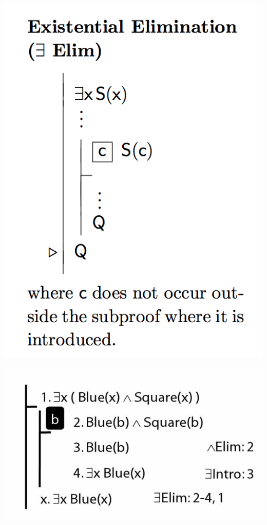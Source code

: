 \documentclass[12pt]{extarticle}
\begin{document}
\begin{multicols*}{3}
\begin{center}
\includegraphics[scale=0.3]{img/rule_existential_elim.png}
\end{center}
\begin{center}
\includegraphics[scale=0.3]{img/proof_existential_elim.png}
\end{center}
\begin{minipage}{\columnwidth}
 

\end{minipage}
\end{multicols*}
\end{document}

